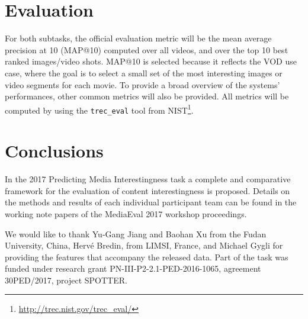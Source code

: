 \documentclass[sigconf]{acmart-me}
\begin{document}

\vspace{-0.2cm}
\section{Evaluation}

For both subtasks, the official evaluation metric will be the mean average precision at 10 (MAP@10) computed over all videos, and over the top 10 best ranked images/video shots. MAP@10 is selected because it reflects the VOD use case, where the goal is to select a small set of the most interesting images or video segments for each movie. To provide a broad overview of the systems' performances, other common metrics will also be provided. All metrics will be computed by using the \texttt{trec\_eval} tool from
NIST\footnote{\url{http://trec.nist.gov/trec\_eval/}}.

\vspace{-0.2cm}
\section{Conclusions}
In the 2017 Predicting Media Interestingness task a complete and comparative framework for the evaluation of content interestingness is proposed. 
Details on the methods and results of each individual
participant team can be found in the working note papers of the
MediaEval 2017 workshop proceedings.

\vspace{-0.2cm}
\begin{acks}
{\small
We would like to thank Yu-Gang Jiang and Baohan Xu
from the Fudan University, China, Herv\'{e} Bredin, from LIMSI,
France, and Michael Gygli for providing the features that accompany the
released data. Part of the task was funded under research grant PN-III-P2-2.1-PED-2016-1065, agreement 30PED/2017, project SPOTTER.}
\end{acks}



\def\bibfont{\small} %

\end{document}
